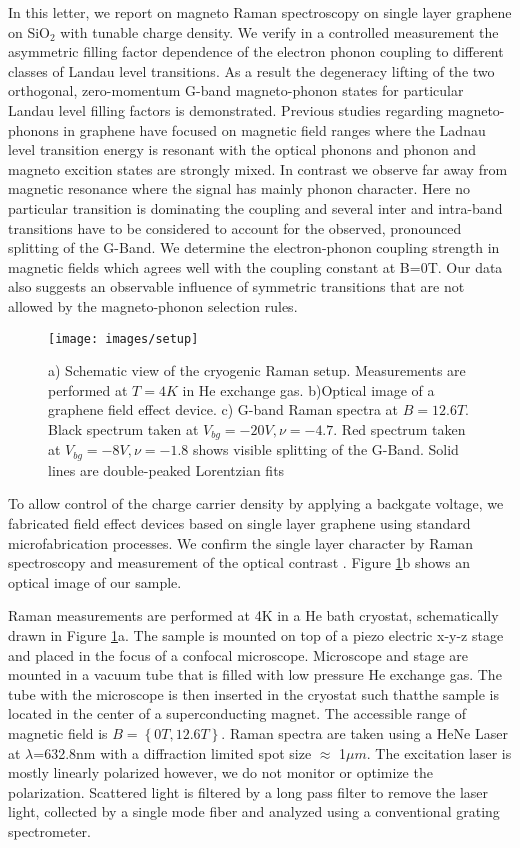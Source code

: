 \documentclass[prl,aps,superscriptaddress,showpacs,reprint]{revtex4-1}
\begin{document}
In this letter, we report on magneto Raman spectroscopy on single layer graphene on SiO$_2$ with tunable charge density. We verify in a controlled measurement the asymmetric filling factor dependence of the electron phonon coupling to different classes of Landau level transitions. As a result the degeneracy lifting of the two orthogonal, zero-momentum G-band magneto-phonon states for particular Landau level filling factors is demonstrated. Previous studies regarding magneto-phonons in graphene have focused on magnetic field ranges where the Ladnau level transition energy is resonant with the optical phonons and phonon and magneto excition states are strongly mixed. In contrast we observe far away from magnetic resonance where the signal has mainly phonon character. Here no particular transition is dominating the coupling and several inter and intra-band transitions have to be considered to account for the observed, pronounced splitting of the G-Band. We determine the electron-phonon coupling strength in magnetic fields which agrees well with the coupling constant at B=0T. Our data also suggests an observable influence of symmetric transitions that are not allowed by the magneto-phonon selection rules.

\begin{figure}
    \texttt{[image: images/setup]}
    \caption{\label{setup}a) Schematic view of the cryogenic Raman setup. Measurements are performed at $T=4K$ in He exchange gas. b)Optical image of a graphene field effect device. c) G-band Raman spectra at $B=12.6T$. Black spectrum taken at $V_{bg}=-20V, \nu=-4.7$. Red spectrum taken at $V_{bg}=-8V,\nu=-1.8$ shows visible splitting of the G-Band. Solid lines are double-peaked Lorentzian fits}
\end{figure}

To allow control of the charge carrier density by applying a backgate voltage, we fabricated field effect devices based on single layer graphene using standard microfabrication processes. We confirm the single layer character by Raman spectroscopy and measurement of the optical contrast \cite{ferrari2006raman,casiraghi2007rayleigh,ni2007graphene,blake2007making}. Figure \ref{setup}b shows an optical image of our sample.

Raman measurements are performed at 4K in a He bath cryostat, schematically drawn in Figure \ref{setup}a. The sample is mounted on top of a piezo electric x-y-z stage and placed in the focus of a confocal microscope. Microscope and stage are mounted in a vacuum tube that is filled with low pressure He exchange gas. The tube with the microscope is then inserted in the cryostat such thatthe sample is located in the center of a superconducting magnet. The accessible range of magnetic field is $B=\left\lbrace 0T,12.6T \right\rbrace$.
Raman spectra are taken using a HeNe Laser at $\lambda$=632.8nm with a diffraction limited spot size $\approx$ 1$\mu m$. The excitation laser is mostly linearly polarized however, we do not monitor or optimize the polarization. Scattered light is filtered by a long pass filter to remove the laser light, collected by a single mode fiber and analyzed using a conventional grating spectrometer. 
\end{document}
